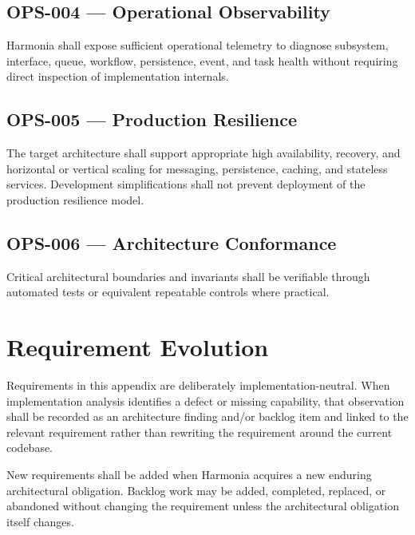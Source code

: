 \subsection{OPS-004 --- Operational Observability}
Harmonia shall expose sufficient operational telemetry to diagnose subsystem, interface, queue, workflow, persistence, event, and task health without requiring direct inspection of implementation internals.

\subsection{OPS-005 --- Production Resilience}
The target architecture shall support appropriate high availability, recovery, and horizontal or vertical scaling for messaging, persistence, caching, and stateless services. Development simplifications shall not prevent deployment of the production resilience model.

\subsection{OPS-006 --- Architecture Conformance}
Critical architectural boundaries and invariants shall be verifiable through automated tests or equivalent repeatable controls where practical.

\section{Requirement Evolution}

Requirements in this appendix are deliberately implementation-neutral. When implementation analysis identifies a defect or missing capability, that observation shall be recorded as an architecture finding and/or backlog item and linked to the relevant requirement rather than rewriting the requirement around the current codebase.

New requirements shall be added when Harmonia acquires a new enduring architectural obligation. Backlog work may be added, completed, replaced, or abandoned without changing the requirement unless the architectural obligation itself changes.
